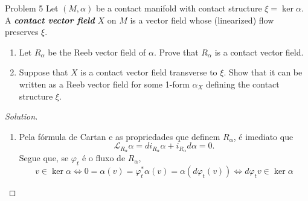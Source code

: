 \begin{thing4}{Problem 5}\leavevmode
	Let $(M,\alpha)$ be a contact manifold with contact structure $\xi=\ker \alpha$. A \textit{\textbf{contact vector field}} $X$ on $M$ is a vector field whose (linearized) flow preserves $\xi$.
	\begin{enumerate}[label=(\alph*)]
	\item Let $R_\alpha$ be the Reeb vector field of $\alpha$. Prove that $R_\alpha$ is a contact vector field.
	\item Suppose that $X$ is a contact vector field transverse to $\xi$. Show that it can be written as a Reeb vector field for some 1-form $\alpha_X$ defining the contact structure $\xi$.
	\end{enumerate}
\end{thing4}

\begin{proof}[Solution]\leavevmode
\begin{enumerate}[label=(\alph*)]
\item Pela  fórmula de Cartan e as propriedades que definem $R_\alpha$, é imediato que
	\[\mathcal{L}_{R_\alpha}\alpha=d i_{R_\alpha}\alpha+i_{R_\alpha}d\alpha=0.\]
	Segue que, se $\varphi_t$ é o fluxo de $R_\alpha$,
	\[v \in \ker \alpha \iff 0=\alpha(v)=\varphi^*_t\alpha(v)=\alpha(d\varphi_t(v)) \iff d\varphi_tv \in \ker \alpha\]
	
	
\end{enumerate}
\end{proof}




